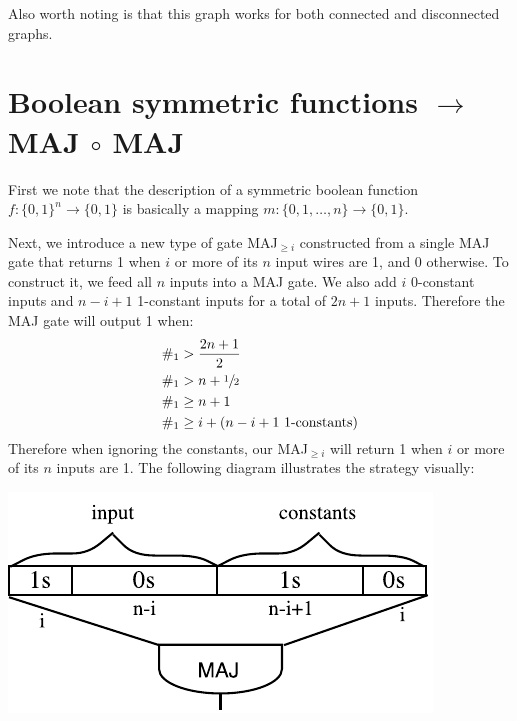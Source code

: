 \documentclass{article}
\begin{document}
Also worth noting is that this graph works for both connected and disconnected graphs.

\newpage
\section{Boolean symmetric functions $\rightarrow$ MAJ $\circ$ MAJ}

First we note that the description of a symmetric boolean function $f:\{0,1\}^n\rightarrow \{0,1\}$ is basically a mapping $m:\{0,1,\dotsc,n\}\rightarrow \{0,1\}$.

Next, we introduce a new type of gate MAJ$_{\geq i}$ constructed from a single MAJ gate that returns 1 when $i$ or more of its $n$ input wires are 1, and 0 otherwise. To construct it, we feed all $n$ inputs into a MAJ gate. We also add $i$ 0-constant inputs and $n-i+1$ 1-constant inputs for a total of $2n+1$ inputs. Therefore the MAJ gate will output 1 when:
\begin{align*}
\#_1 &> \frac{2n+1}{2} \\
\#_1 &> n + \sfrac{1}{2} \\
\#_1 &\geq n + 1 \\
\#_1 &\geq i + (n-i+1 \text{ 1-constants})
\end{align*}
Therefore when ignoring the constants, our MAJ$_{\geq i}$ will return 1 when $i$ or more of its $n$ inputs are 1. The following diagram illustrates the strategy visually:

\includegraphics{q3_maj_geq.pdf}

\end{document}
